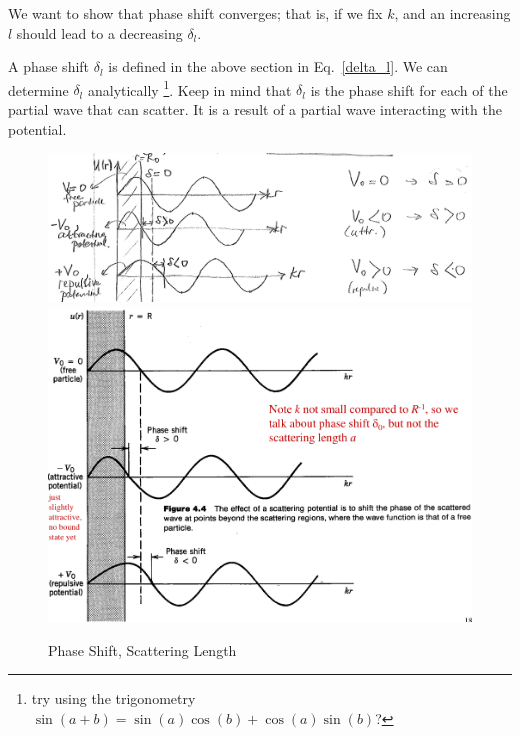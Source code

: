 \documentclass{school-22.101-notes}
\date{October 26, 2011}
\begin{document}
\maketitle


We want to show that phase shift converges; that is, if we fix $k$, and an increasing $l$ should lead to a decreasing $\delta_l$. 

A phase shift $\delta_l$ is defined in the above section in Eq.~\ref{delta_l}. We can determine $\delta_l$ analytically \footnote{try using the trigonometry $\sin(a+b) = \sin(a) \cos (b) + \cos(a) \sin(b)$?}. Keep in mind that $\delta_l$ is the phase shift for each of the partial wave that can scatter. It is a result of a partial wave interacting with the potential.  
\begin{figure}[ht]
    \centering
    \includegraphics[width=6in]{images/scattering/scattering-potential-phase-shift.png}
    \includegraphics[width=6in]{images/scattering/scattering-potential-phase-shift-2.png}
    \caption{Phase Shift, Scattering Length }
\end{figure}
\end{document}
